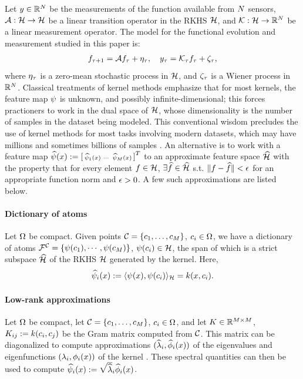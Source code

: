 Let $y\in\mathbb{R}^{N}$ be the measurements of the function available from $N$ sensors, $\mathcal{A}:\mathcal{H}\to\mathcal{H}$ be a linear transition operator in the RKHS $\mathcal{H}$, and $\mathcal{K}:\mathcal{H}\to\mathbb{R}^{N}$ be a linear measurement operator. The model for the functional evolution and measurement studied in this paper is:
\begin{align}\eqlabel{ideal_lin_evol}
 f_{\tindex+1} = \sysop f_{\tindex} + \eta_{\tindex}, \quad
 y_{\tindex} = \measop_{\tindex} f_{\tindex} + \zeta_{\tindex},
\end{align}
where $\eta_{\tau}$ is a zero-mean stochastic process in $\mathcal{H}$, and $\zeta_{\tau}$ is a Wiener process in $\mathbb{R}^{N}$. 
Classical treatments of kernel methods emphasize that for most kernels, the feature map $\psi$ is unknown, and possibly infinite-dimensional; this forces practioners to work in the dual space of $\mathcal{H}$, whose dimensionality is the number of samples in the dataset being modeled. This conventional wisdom precludes the use of kernel methods for most tasks involving modern datasets, which may have millions and sometimes billions of samples \cite{rahimi2007random}. An alternative is to work with a feature map 
$\widehat{\psi}(x) := \left[\begin{smallmatrix}
  \widehat{\psi}_1(x) & \cdots & \widehat{\psi}_{M}(x)
 \end{smallmatrix}\right]^T$ to an approximate feature space
 $\widehat{\mathcal{H}}$ with the property that for every element $f\in\mathcal{H}$, $\exists\widehat{f}\in\widehat{\mathcal{H}}$ s.t. $\|f-\widehat{f}\| < \epsilon$ for an appropriate function norm and $\epsilon>0$. A few such approximations are listed below.
\paragraph{Dictionary of atoms} Let $\Omega$ be compact. Given points $\mathcal{C} = \{c_1,\dots,c_{M}\}$, $c_i\in\Omega$, we have a dictionary of atoms $\mathcal{F}^{\mathcal{C}} = \{\psi(c_1), \cdots , \psi(c_{M})\}$, $\psi(c_i)\in\mathcal{H}$, the span of which is a strict subspace $\widehat{\mathcal{H}}$ of the RKHS $\mathcal{H}$ generated by the kernel. Here, 
 \begin{equation}\eqlabel{fmap_dict}
 \fmapApprox_i(x) := \l\fmap(x), \fmap(c_i)\r_{\fspace} = \kernel(x, c_i).
 \end{equation}
\paragraph{Low-rank approximations} Let $\Omega$ be compact, let $\mathcal{C} = \{c_1,\dots,c_{M}\}$, $c_i\in\Omega$, and let $K\in\mathbb{R}^{M\times M}$, $K_{ij}:=k(c_i,c_j)$ be the Gram matrix computed from $\mathcal{C}$. This matrix can be diagonalized to compute approximations $(\widehat {\lambda}_i, \widehat \phi_i(x))$ of the eigenvalues and eigenfunctions $(\lambda_i, \phi_i(x))$ of the kernel \cite{williams2001using2}. These spectral quantities can then be used to compute  $ \widehat{\psi}_i(x):=\sqrt{\widehat {\lambda}}_i\widehat \phi_i(x)$.
